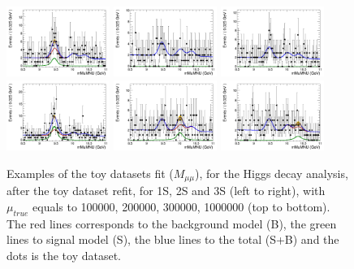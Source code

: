 \begin{figure}[!htbp]
\begin{center}
\includegraphics[width=0.3\textwidth]{figures/modeling_xchecks/plots/HToUpsilon1SPhoton_Cat0_signalStrenght_300000/Cat0_mMuMNU_fit_s}
\includegraphics[width=0.3\textwidth]{figures/modeling_xchecks/plots/HToUpsilon2SPhoton_Cat0_signalStrenght_300000/Cat0_mMuMNU_fit_s}
\includegraphics[width=0.3\textwidth]{figures/modeling_xchecks/plots/HToUpsilon3SPhoton_Cat0_signalStrenght_300000/Cat0_mMuMNU_fit_s}
\includegraphics[width=0.3\textwidth]{figures/modeling_xchecks/plots/HToUpsilon1SPhoton_Cat0_signalStrenght_1000000/Cat0_mMuMNU_fit_s}
\includegraphics[width=0.3\textwidth]{figures/modeling_xchecks/plots/HToUpsilon2SPhoton_Cat0_signalStrenght_1000000/Cat0_mMuMNU_fit_s}
\includegraphics[width=0.3\textwidth]{figures/modeling_xchecks/plots/HToUpsilon3SPhoton_Cat0_signalStrenght_1000000/Cat0_mMuMNU_fit_s}
\end{center}
\caption{Examples of the toy datasets fit ($M_{\mu\mu}$), for the Higgs decay analysis, after the toy dataset refit, for 1S, 2S and 3S (left to right), with $\mu_{true}$ equals to 100000, 200000, 300000, 1000000 (top to bottom). The red lines corresponds to the background model (B), the green lines to signal model (S), the blue lines to the total (S+B) and the dots is the toy dataset.}
\label{fig:fits_xchecks_mMuMNU_H}
\end{figure}





